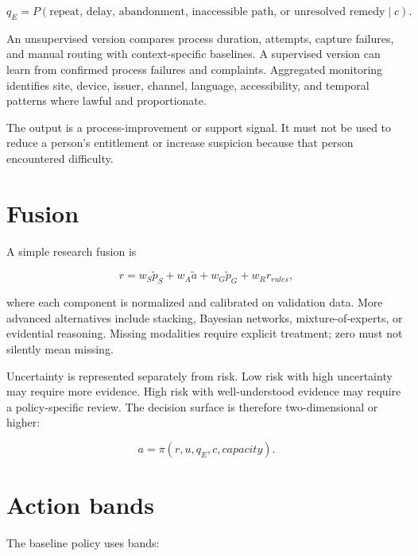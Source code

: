\begin{equation}
q_E=P(\text{repeat, delay, abandonment, inaccessible path, or unresolved remedy}\mid c).
\end{equation}

An unsupervised version compares process duration, attempts, capture failures, and manual routing with context-specific baselines. A supervised version can learn from confirmed process failures and complaints. Aggregated monitoring identifies site, device, issuer, channel, language, accessibility, and temporal patterns where lawful and proportionate.

The output is a process-improvement or support signal. It must not be used to reduce a person's entitlement or increase suspicion because that person encountered difficulty.

\section{Fusion}

A simple research fusion is

\begin{equation}
r=w_S\tilde{p}_S+w_A\tilde{a}+w_G\tilde{p}_G+w_R r_{rules},
\end{equation}

where each component is normalized and calibrated on validation data. More advanced alternatives include stacking, Bayesian networks, mixture-of-experts, or evidential reasoning. Missing modalities require explicit treatment; zero must not silently mean missing.

Uncertainty is represented separately from risk. Low risk with high uncertainty may require more evidence. High risk with well-understood evidence may require a policy-specific review. The decision surface is therefore two-dimensional or higher:

\begin{equation}
a=\pi(r,u,q_E,c,capacity).
\end{equation}

\section{Action bands}

The baseline policy uses bands:

